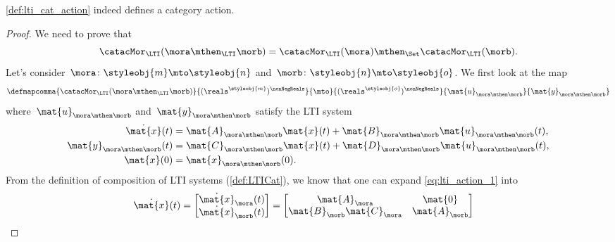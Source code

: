 \begin{lemma}
    \cref{def:lti_cat_action} indeed defines a category action.
\end{lemma}
\begin{proof}
    We need to prove that
    \begin{equation*}
        \catacMor_\LTI(\mora \mthen_\LTI \morb)=\catacMor_\LTI(\mora) \mthen_\Set \catacMor_\LTI(\morb).
    \end{equation*}
    Let's consider~$\mora \colon \styleobj{m}\mto \styleobj{n}$ and~$\morb\colon \styleobj{n}\mto \styleobj{o}$.
    We first look at the map
    \begin{equation*}
        \defmapcomma{\catacMor_\LTI(\mora \mthen_\LTI \morb)}{(\reals^\styleobj{m})^{\nonNegReals}}{\mto}{(\reals^\styleobj{o})^{\nonNegReals}}
        {\mat{u}_{\mora \mthen \morb}}{\mat{y}_{\mora \mthen \morb}}
    \end{equation*}
    where~$\mat{u}_{\mora \mthen \morb}$ and~$\mat{y}_{\mora \mthen \morb}$ satisfy the LTI system
    \begin{equation}
        \label{eq:lti_action_1}
        \begin{aligned}
            \dot{\mat{x}}(t)                & =\mat{A}_{\mora \mthen \morb}\mat{x}(t)+\mat{B}_{\mora \mthen \morb}\mat{u}_{\mora \mthen \morb}(t), \\
            \mat{y}_{\mora \mthen \morb}(t) & =\mat{C}_{\mora \mthen \morb}\mat{x}(t)+\mat{D}_{\mora \mthen \morb}\mat{u}_{\mora \mthen \morb}(t), \\
            \mat{x}(0)                      & =\mat{x}_{\mora \mthen \morb}(0).
        \end{aligned}
    \end{equation}
    From the definition of composition of LTI systems (\cref{def:LTICat}), we know that one can expand \cref{eq:lti_action_1} into
    \begin{equation}
        \label{eq:lti_action_12}
        \begin{aligned}
            \dot{\mat{x}}(t)=\begin{bmatrix}
                                 \dot{\mat{x}}_\mora(t) \\
                                 \dot{\mat{x}}_\morb(t)
                             \end{bmatrix} & =\begin{bmatrix}
                                                  \mat{A}_\mora              & \mat{0}       \\
                                                  \mat{B}_\morb\mat{C}_\mora & \mat{A}_\morb

\end{bmatrix}
\end{aligned}
\end{equation}
\end{proof}
